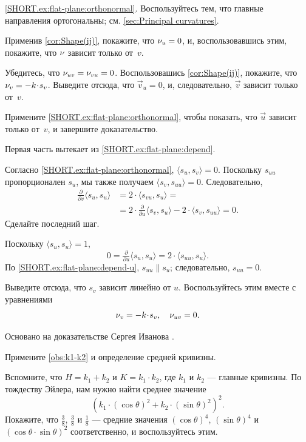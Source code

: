 \begin{multicols}{2}
\parbf{\ref{ex:flat-plane};} \ref{SHORT.ex:flat-plane:orthonormal}.
Воспользуйтесь тем, что главные направления ортогональны; см. \ref{sec:Principal curvatures}.

Применив \ref{cor:Shape(ij)}, покажите, что $\nu_u=0$, и, воспользовавшись этим, покажите, что $\nu$ зависит только от~$v$.

Убедитесь, что $\nu_{uv}=\nu_{vu}=0$.
Воспользовашись \ref{cor:Shape(ij)}, покажите, что $\Norm_v\z=-k \cdot s_v$.
Выведите отсюда, что $\vec v_u=0$, и, следовательно, $\vec v$ зависит только от~$v$.

Примените \ref{SHORT.ex:flat-plane:orthonormal}, чтобы показать, что $\vec u$ зависит только от~$v$, и
завершите доказательство.

Первая часть вытекает из \ref{SHORT.ex:flat-plane:depend}.

Согласно \ref{SHORT.ex:flat-plane:orthonormal}, $\langle s_u,s_v\rangle=0$.
Поскольку $s_{uu}$ пропорционален $s_u$, мы также получаем $\langle s_{v},s_{uu}\rangle=0$.
Следовательно,
\begin{align*}
\tfrac{\partial}{\partial v}\langle s_u,s_u\rangle&=2\cdot \langle s_{vu},s_u\rangle=
\\
&=2\cdot \tfrac{\partial}{\partial u}\langle s_v,s_u\rangle-2\cdot \langle s_{v},s_{uu}\rangle=0.
\end{align*}
Сделайте последний шаг.

Поскольку $\langle s_u,s_u\rangle=1$,
\[0=\tfrac{\partial}{\partial u}\langle s_u,s_u\rangle=2\cdot\langle s_{uu},s_u\rangle.\]
По \ref{SHORT.ex:flat-plane:depend-u}, $s_{uu}\parallel s_u$; следовательно, $s_{uu}=0$.

Выведите отсюда, что $s_v$ зависит линейно от $u$.
Воспользуйтесь этим вместе с уравнениями
\[\Norm_v=-k\cdot s_v,\quad \Norm_{uv}=0.\]

Основано на доказательстве Сергея Иванова \cite[3-й сем. Лекция 13]{ivanov}.

\setcounter{eqtn}{0}

Примените \ref{obs:k1-k2} и определение средней кривизны.

Вспомните, что $H=k_1+k_2$ и $K=k_1\cdot k_2$, где $k_1$ и $k_2$ --- главные кривизны.
По тождеству Эйлера, нам нужно найти среднее значение
\[(k_1\cdot (\cos\theta)^2+k_2\cdot (\sin\theta)^2)^2.\]
Покажите, что $\tfrac38$, $\tfrac38$ и $\tfrac18$ --- средние значения $(\cos\theta)^4$, $(\sin\theta)^4$ и $(\cos\theta\cdot \sin\theta)^2$ соответственно, и воспользуйтесь этим.


\end{multicols}
